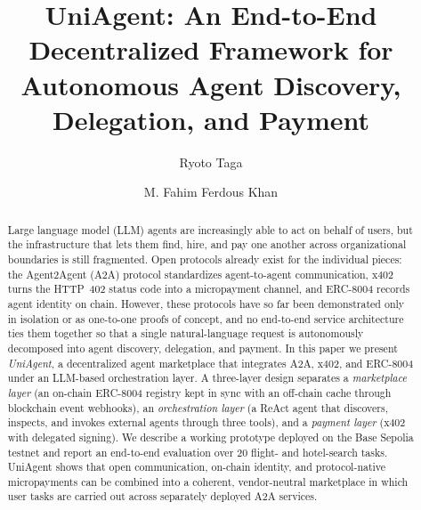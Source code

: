\documentclass[sigconf]{acmart}
\begin{document}
\title[UniAgent: End-to-End Decentralized Agent Framework]{UniAgent: An End-to-End Decentralized Framework for Autonomous Agent Discovery, Delegation, and Payment}

\author{Ryoto Taga}
\author{M. Fahim Ferdous Khan}

\renewcommand{\shortauthors}{Taga and Khan}

\begin{abstract}
  Large language model (LLM) agents are increasingly able to act on
  behalf of users, but the infrastructure that lets them find, hire,
  and pay one another across organizational boundaries is still
  fragmented. Open protocols already exist for the individual pieces:
  the Agent2Agent (A2A) protocol standardizes agent-to-agent
  communication, x402 turns the HTTP~402 status code into a
  micropayment channel, and ERC-8004 records agent identity on chain.
  However, these protocols have so far been demonstrated only in
  isolation or as one-to-one proofs of concept, and no end-to-end
  service architecture ties them together so that a single
  natural-language request is autonomously decomposed into agent
  discovery, delegation, and payment. In this paper we present
  \emph{UniAgent}, a decentralized agent marketplace that integrates
  A2A, x402, and ERC-8004 under an LLM-based orchestration layer. A
  three-layer design separates a \emph{marketplace layer} (an on-chain
  ERC-8004 registry kept in sync with an off-chain cache through
  blockchain event webhooks), an \emph{orchestration layer} (a ReAct
  agent that discovers, inspects, and invokes external agents through
  three tools), and a \emph{payment layer} (x402 with delegated
  signing). We describe a working
  prototype deployed on the Base Sepolia testnet and report an
  end-to-end evaluation over 20 flight- and hotel-search tasks. UniAgent
  shows that open communication, on-chain identity, and
  protocol-native micropayments can be combined into a coherent,
  vendor-neutral marketplace in which user tasks are carried out
  across separately deployed A2A services.
\end{abstract}
\end{document}
